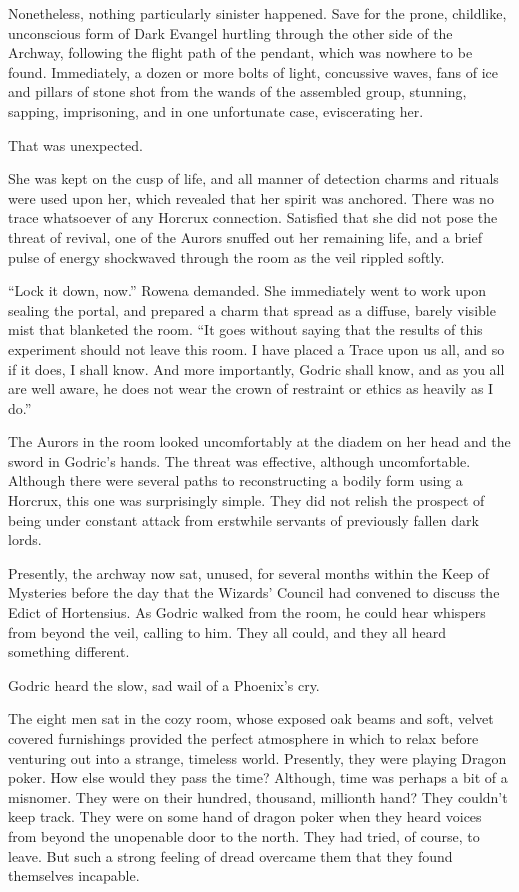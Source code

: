 Nonetheless, nothing particularly sinister happened. Save for the prone, childlike, unconscious form of Dark Evangel hurtling through the other side of the Archway, following the flight path of the pendant, which was nowhere to be found. Immediately, a dozen or more bolts of light, concussive waves, fans of ice and pillars of stone shot from the wands of the assembled group, stunning, sapping, imprisoning, and in one unfortunate case, eviscerating her.

That was unexpected.

She was kept on the cusp of life, and all manner of detection charms and rituals were used upon her, which revealed that her spirit was anchored. There was no trace whatsoever of any Horcrux connection. Satisfied that she did not pose the threat of revival, one of the Aurors snuffed out her remaining life, and a brief pulse of energy shockwaved through the room as the veil rippled softly.

“Lock it down, now.” Rowena demanded. She immediately went to work upon sealing the portal, and prepared a charm that spread as a diffuse, barely visible mist that blanketed the room. “It goes without saying that the results of this experiment should not leave this room. I have placed a Trace upon us all, and so if it does, I shall know. And more importantly, Godric shall know, and as you all are well aware, he does not wear the crown of restraint or ethics as heavily as I do.”

The Aurors in the room looked uncomfortably at the diadem on her head and the sword in Godric’s hands. The threat was effective, although uncomfortable. Although there were several paths to reconstructing a bodily form using a Horcrux, this one was surprisingly simple. They did not relish the prospect of being under constant attack from erstwhile servants of previously fallen dark lords.

Presently, the archway now sat, unused, for several months within the Keep of Mysteries before the day that the Wizards’ Council had convened to discuss the Edict of Hortensius. As Godric walked from the room, he could hear whispers from beyond the veil, calling to him. They all could, and they all heard something different.

Godric heard the slow, sad wail of a Phoenix’s cry.
\simpleline	


The eight men sat in the cozy room, whose exposed oak beams and soft, velvet covered furnishings provided the perfect atmosphere in which to relax before venturing out into a strange, timeless world. Presently, they were playing Dragon poker. How else would they pass the time? Although, time was perhaps a bit of a misnomer. They were on their hundred, thousand, millionth hand? They couldn’t keep track. They were on some hand of dragon poker when they heard voices from beyond the unopenable door to the north. They had tried, of course, to leave. But such a strong feeling of dread overcame them that they found themselves incapable.

